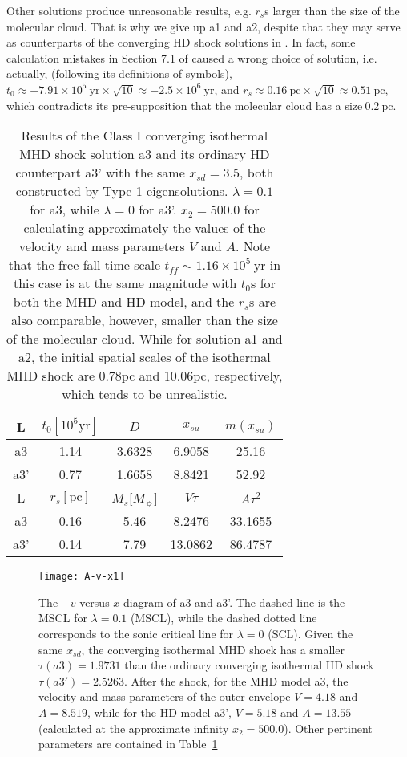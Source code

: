 \documentclass[fleqn,usenatbib]{mnras}
\begin{document}
Other solutions produce unreasonable results, e.g. $r_{s}$s larger than the size of the molecular cloud. That is why we give up a1 and a2, despite that they may serve as counterparts of the converging HD shock solutions in \citet{lou2014self}. In fact, some calculation mistakes in Section 7.1 of \citet{lou2014self} caused a wrong choice of solution, i.e. actually, (following its definitions of symbols), $t_{0}\approx -7.91\times 10^{5}~\mathrm{yr} \times\sqrt{10}\approx -2.5\times 10^{6}~\mathrm{yr}$, and $r_{s}\approx 0.16~\mathrm{pc}\times \sqrt{10}\approx 0.51~\mathrm{pc}$, which contradicts its pre-supposition that the molecular cloud has a size$~0.2~\mathrm{pc}$.

\begin{table}
\centering
\caption{Results of the Class I converging isothermal MHD shock solution a3 and its ordinary HD counterpart a3' with the same $x_{sd}=3.5$, both constructed by Type 1 eigensolutions. $\lambda=0.1$ for a3, while $\lambda=0$ for a3'. $x_{2}=500.0$ for calculating approximately the values of the velocity and mass parameters $V$ and $A$. Note that the free-fall time scale $t_{ff}\sim 1.16\times 10^{5}~\mathrm{yr}$ in this case is at the same magnitude with $t_{0}$s for both the MHD and HD model, and the $r_{s}$s are also comparable, however, smaller than the size of the molecular cloud. While for solution a1 and a2, the initial spatial scales of the isothermal MHD shock are 0.78pc and 10.06pc, respectively, which tends to be unrealistic.} 
\begin{tabular}{ccccc}
\hline
L & $t_{0}[\mathrm{10^{5}yr}]$ & $D$ & $x_{su}$ & $m(x_{su})$\\
\hline
a3 & 1.14 & 3.6328 & 6.9058 & 25.16\\
a3' & 0.77 & 1.6658 & 8.8421 & 52.92\\
\hline
L & $r_{s}[\mathrm{pc}]$ & $M_{s}$[$M_{\sun}$] & $V\tau$ & $A\tau^{2}$ \\
\hline
a3 & 0.16 & 5.46 & 8.2476 & 33.1655\\
a3' & 0.14 & 7.79 & 13.0862 & 86.4787\\
\hline
\end{tabular}
\label{ta1}
\end{table}

\begin{figure}
\centering
\texttt{[image: A-v-x1]}
\caption{The $-v$ versus $x$ diagram of a3 and a3'. The dashed line is the MSCL for $\lambda=0.1$ (MSCL), while the dashed dotted line corresponds to the sonic critical line for $\lambda=0$ (SCL). Given the same $x_{sd}$, the converging isothermal MHD shock has a smaller $\tau(a3)=1.9731$ than the ordinary converging isothermal HD shock $\tau(a3')=2.5263$. After the shock, for the MHD model a3, the velocity and mass parameters of the outer envelope $V=4.18$ and $A=8.519$, while for the HD model a3', $V=5.18$ and $A=13.55$ (calculated at the approximate infinity $x_{2}=500.0$). Other pertinent parameters are contained in Table~\ref{ta1}}
\label{fa1}
\end{figure}
\end{document}
